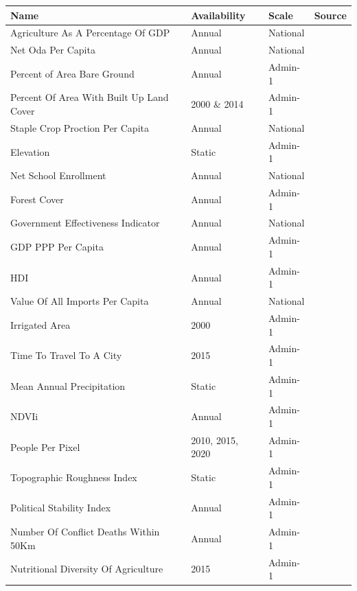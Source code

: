 \documentclass{article}
\begin{document}
\begin{table}[H]
	\begin{tabular}{llll}
		\toprule
		Name & Availability & Scale & Source \\
		\midrule
		Agriculture As A Percentage Of GDP & Annual & National & \cite{TheWorldBank2016} \\
		Net Oda Per Capita & Annual & National & \cite{TheWorldBank2016} \\
		Percent of Area Bare Ground & Annual & Admin-1 & \cite{Song2018} \\
		Percent Of Area With Built Up Land Cover & 2000 \& 2014 & Admin-1 & \cite{Pesaresi2015} \\
		Staple Crop Proction Per Capita & Annual & National & \cite{FAOSTAT2018} \\
		Elevation & Static & Admin-1 & \cite{USGS1996} \\
		Net School Enrollment & Annual & National & \cite{TheWorldBank2016} \\
		Forest Cover & Annual & Admin-1 & \cite{Song2018} \\
		Government Effectiveness Indicator & Annual & National & \cite{Kaufmann2011} \\
		GDP PPP Per Capita & Annual & Admin-1 & \cite{Kummu2018} \\
		HDI & Annual & Admin-1 & \cite{Kummu2018} \\
		Value Of All Imports Per Capita & Annual & National & \cite{TheWorldBank2016} \\
		Irrigated Area & 2000 & Admin-1 & \cite{SiebertS.DollP.FeickS.FrenkenK.Hoogeveen2013} \\
		Time To Travel To A City  & 2015 & Admin-1 & \cite{Uchida2008} \\
		Mean Annual Precipitation & Static & Admin-1 & \cite{Funk2015} \\
		NDVIi & Annual & Admin-1 & \cite{Song2018} \\
		People Per Pixel & 2010, 2015, 2020 & Admin-1 & \cite{Doxsey-Whitfield2015} \\
		Topographic Roughness Index & Static & Admin-1 & \cite{USGS1996, Riley1999} \\
		Political Stability Index & Annual & Admin-1 & \cite{Kaufmann2011} \\
		Number Of Conflict Deaths Within 50Km & Annual & Admin-1 & \cite{Eriksson2015} \\
		Nutritional Diversity Of Agriculture & 2015 & Admin-1 & \cite{Herrero2017a} \\

\end{tabular}
\end{table}
\end{document}
